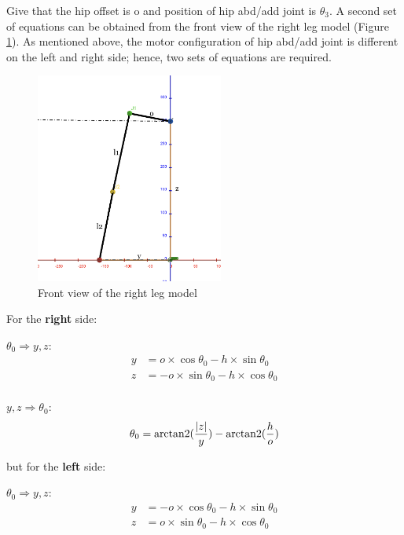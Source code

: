 Give that the hip offset is o and position of hip abd/add joint is $\theta_3$. A second set of equations can be obtained from the front view of the right leg model (Figure \ref{fig:right_leg_model_front_view}). As mentioned above, the motor configuration of hip abd/add joint is different on the left and right side; hence, two sets of equations are required.

\begin{figure}[htbp]\label{fig:right_leg_model_front_view}
   \centering
   \includegraphics[width=0.55\textwidth]{figures/right_leg_model_front_view.jpg}
   \caption{Front view of the right leg model}
\end{figure}

For the \textbf{right} side:

\indent\indent
$\theta_0 \Rightarrow y, z$:
\begin{align*}
y &=  o \times \cos\theta_0 - h \times \sin\theta_0 \\
z &= -o \times \sin\theta_0 - h \times \cos\theta_0 \\
\end{align*}

\indent\indent
$y, z \Rightarrow \theta_0$:
\begin{equation*}
   \theta_0 = \operatorname{arctan2}(\frac{\lvert z \lvert}{y}) - \operatorname{arctan2}(\frac{h}{o})
\end{equation*}

but for the \textbf{left} side:

\indent\indent
$\theta_0 \Rightarrow y, z$:
\begin{align*}
y &= -o \times \cos\theta_0 - h \times \sin\theta_0 \\
z &=  o \times \sin\theta_0 - h \times \cos\theta_0 \\
\end{align*}

